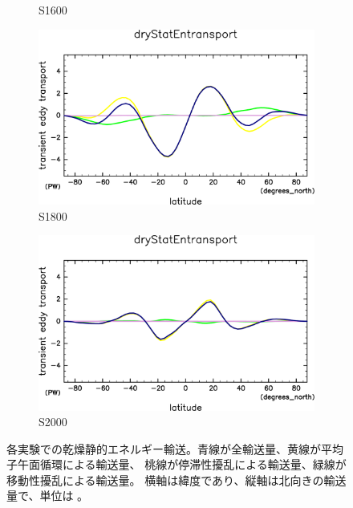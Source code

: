 \documentclass[body]{subfiles}
\begin{document}
\begin{figure}[t]
\begin{subfigure}{.4\textwidth}
		\caption{S1600}\label{乾燥静的エネルギーS1600}
	\end{subfigure}
	\begin{subfigure}{.4\textwidth}
		\centering
		\includegraphics[width=\columnwidth]{S1800/MeriHeatTrans@dryStatEn,time=3650:4015-crop-rotate.pdf}
		\caption{S1800}\label{乾燥静的エネルギーS1800}
	\end{subfigure}
	\begin{subfigure}{.4\textwidth}
		\centering
		\includegraphics[width=\columnwidth]{S2000/MeriHeatTrans@dryStatEn,time=7300:7665-crop-rotate.pdf}
		\caption{S2000}\label{乾燥静的エネルギーS2000}
	\end{subfigure}
	\caption[各実験での乾燥静的エネルギー輸送の内訳]{
		各実験での乾燥静的エネルギー輸送。青線が全輸送量、黄線が平均子午面循環による輸送量、
		桃線が停滞性擾乱による輸送量、緑線が移動性擾乱による輸送量。
		横軸は緯度であり、縦軸は北向きの輸送量で、単位は 。
	}\label{乾燥静的エネルギー}
\end{figure}
\end{document}

